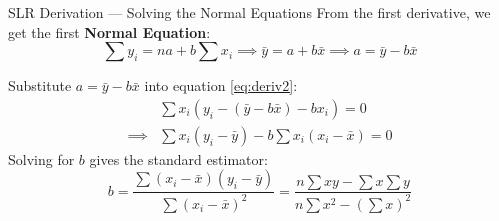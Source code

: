 \documentclass[12pt, aspectratio=169]{beamer}
\begin{document}
    \begin{frame}{SLR Derivation --- Solving the Normal Equations}
    From the first derivative, we get the first \textbf{Normal Equation}:
    \begin{equation*}
        \sum y_i = na + b \sum x_i \implies \bar{y} = a + b\bar{x} \implies a = \bar{y} - b\bar{x}
    \end{equation*}

        Substitute $a = \bar{y} - b\bar{x}$ into equation \ref{eq:deriv2}:
        \begin{align*}
            & \sum x_i (y_i - (\bar{y} - b\bar{x}) - bx_i) = 0 \\
            \implies & \sum x_i (y_i - \bar{y}) - b \sum x_i (x_i - \bar{x}) = 0
        \end{align*}
        Solving for $b$ gives the standard estimator:
        \begin{equation*}
            b = \frac{\sum (x_i - \bar{x})(y_i - \bar{y})}{\sum (x_i - \bar{x})^2} = \frac{n\sum xy - \sum x \sum y}{n\sum x^2 - (\sum x)^2}
        \end{equation*}
    \end{frame}
\end{document}
